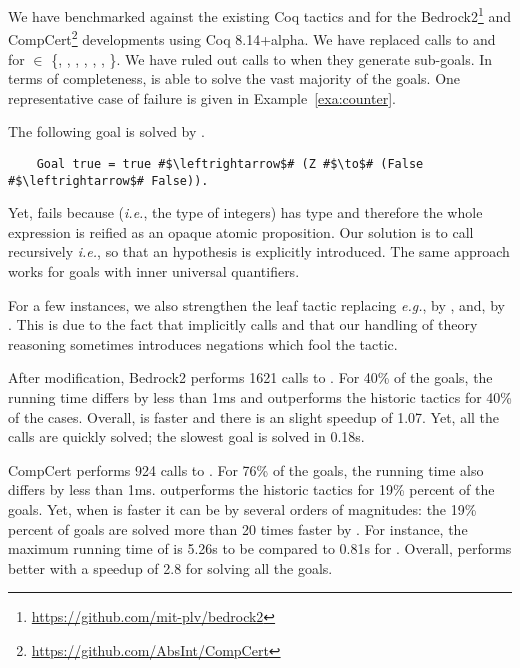 \documentclass[utf8,a4paper,UKenglish,cleveref, autoref, thm-restate]{lipics-v2021}
\begin{document}
We have benchmarked  against the existing Coq tactics
 and  for the
Bedrock2\footnote{\url{https://github.com/mit-plv/bedrock2}} and
CompCert\footnote{\url{https://github.com/AbsInt/CompCert}}
developments using Coq 8.14+alpha.
%
We have replaced calls to  and  for
 $\in$ \{, ,
, , , ,
 \}.
%
We have ruled out calls to  when they generate sub-goals.
%
In  terms of  completeness,   is able  to solve  the vast
majority  of the  goals.  One
representative case of failure is given in Example~\ref{exa:counter}. 
\begin{example} The following goal is solved by .
  \label{exa:counter}
  \begin{verbatim}
    Goal true = true #$\leftrightarrow$# (Z #$\to$# (False #$\leftrightarrow$# False)).
  \end{verbatim}
  Yet,  fails because  (\emph{i.e.},
  the type of integers) has type  and therefore the whole
  expression  is reified as an opaque
  atomic proposition. Our solution is to call 
  recursively \emph{i.e.},  so that
  an hypothesis  is explicitly introduced. The same approach
  works for goals with inner universal quantifiers.
\end{example}
For a few instances, we also strengthen the leaf tactic replacing \emph{e.g.},
 by , and,  by
. This is due to the fact that 
implicitly calls  and that our handling of theory reasoning
sometimes introduces negations which fool the  tactic.

After modification, Bedrock2 performs 1621 calls to . For
 40\% of the goals, the running time differs by less than 1ms and
 outperforms the historic tactics for 40\% of the
cases. Overall,  is faster and there is an slight speedup of 1.07.
Yet, all the calls are quickly solved; the slowest goal is solved in 0.18s.

CompCert performs 924 calls to .  For 76\% of the
goals, the running time also differs by less than 1ms. 
outperforms the  historic tactics for 19\% percent of the
goals. Yet, when  is faster it can be by several orders
of magnitudes: the 19\% percent of goals are solved more than 20 times
faster by .
%
For instance, the maximum running time of  is 5.26s to be
compared to 0.81s for . Overall,  performs
better with a speedup of 2.8 for solving all the goals.
\end{document}
